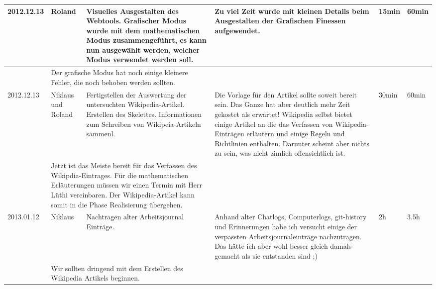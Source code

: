 \documentclass[11pt,paper=a4,final]{scrartcl}
\begin{document}
\begin{landscape}
\begin{longtable}{|p{1.8cm}|p{1.5cm}|p{5.0cm}|p{11.0cm}|l|l|}
    \hline
    2012.12.13 & Roland &
    Visuelles Ausgestalten des Webtools. Grafischer Modus wurde mit dem
    mathematischen Modus zusammengef\"uhrt, es kann nun ausgew\"ahlt werden,
    welcher Modus verwendet werden soll.&
    Zu viel Zeit wurde mit kleinen Details beim Ausgestalten der Grafischen
    Finessen aufgewendet.
    &
    15min & 60min \\ \hline \nopagebreak
    \multicolumn{2}{|l|}{\bf Pendenzen} &\multicolumn{2}{p{16.0cm}|}{
    Der grafische Modus hat noch einige kleinere Fehler, die noch behoben
    werden sollten.
    }  & \multicolumn{2}{l|}{} \\ \hline
    \hline
    2012.12.13 & Niklaus und Roland &
    Fertigstellen der Auswertung der untersuchten Wikipedia-Artikel. Erstellen
    des Skelettes. Informationen zum Schreiben von Wikipeia-Artikeln sammenl.&
    Die Vorlage f\"ur den Artikel sollte soweit bereit sein. Das Ganze hat aber
    deutlich mehr Zeit gekostet als erwartet! Wikipedia selbst bietet einige
    Artikel an die das Verfassen von Wikipedia-Eintr\"agen erl\"autern und
    einige Regeln und Richtlinien enthalten. Darunter scheint aber nichts zu
    sein, was nicht zimlich offensichtlich ist.
    &
    30min & 60min \\ \hline \nopagebreak
    \multicolumn{2}{|l|}{\bf Pendenzen} &\multicolumn{2}{p{16.0cm}|}{Jetzt ist
    das Meiste bereit f\"ur das Verfassen des Wikipdia-Eintrages. F\"ur die
    mathematischen Erl\"auterungen m\"ussen wir einen Termin mit Herr L\"uthi
    vereinbaren. Der Wikipedia-Artikel kann somit in die Phase Realisierung
    \"ubergehen.}  & \multicolumn{2}{l|}{} \\ \hline
    \hline
    2013.01.12 & Niklaus &
    Nachtragen alter Arbeitsjournal Eintr\"age. &
    Anhand alter Chatlogs, Computerlogs, git-history und Erinnerungen habe ich
    versucht einige der verpassten Arbeitsjournaleintr\"age nachzutragen. Das
    h\"atte ich aber wohl besser gleich damals gemacht als sie entstanden sind
    ;)&
    2h & 3.5h \\ \hline \nopagebreak
    \multicolumn{2}{|l|}{\bf Pendenzen} &\multicolumn{2}{p{16.0cm}|}{
    Wir sollten dringend mit dem Erstellen des Wikipedia Artikels beginnen.
}
\end{longtable}
\end{landscape}
\end{document}
